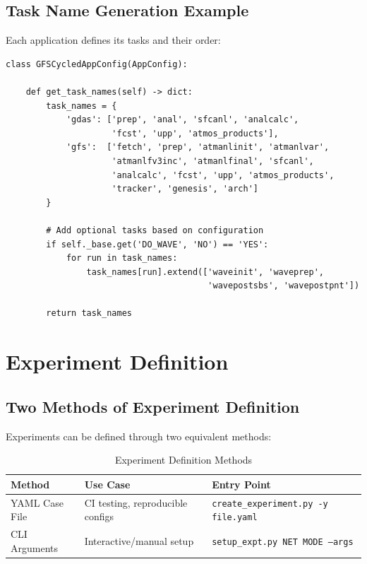 \documentclass[11pt,letterpaper]{article}
\begin{document}
\subsection{Task Name Generation Example}

Each application defines its tasks and their order:

\begin{lstlisting}[style=pythonstyle, title=gfs\_cycled.py (Excerpt)]
class GFSCycledAppConfig(AppConfig):
    
    def get_task_names(self) -> dict:
        task_names = {
            'gdas': ['prep', 'anal', 'sfcanl', 'analcalc', 
                     'fcst', 'upp', 'atmos_products'],
            'gfs':  ['fetch', 'prep', 'atmanlinit', 'atmanlvar',
                     'atmanlfv3inc', 'atmanlfinal', 'sfcanl',
                     'analcalc', 'fcst', 'upp', 'atmos_products',
                     'tracker', 'genesis', 'arch']
        }
        
        # Add optional tasks based on configuration
        if self._base.get('DO_WAVE', 'NO') == 'YES':
            for run in task_names:
                task_names[run].extend(['waveinit', 'waveprep',
                                        'wavepostsbs', 'wavepostpnt'])
        
        return task_names
\end{lstlisting}


\section{Experiment Definition}

\subsection{Two Methods of Experiment Definition}

Experiments can be defined through two equivalent methods:

\begin{table}[H]
\centering
\caption{Experiment Definition Methods}
\label{tab:definition-methods}
\begin{tabular}{@{}lll@{}}
\toprule
\textbf{Method} & \textbf{Use Case} & \textbf{Entry Point} \\
\midrule
YAML Case File & CI testing, reproducible configs & \texttt{create\_experiment.py -y file.yaml} \\
CLI Arguments & Interactive/manual setup & \texttt{setup\_expt.py NET MODE --args} \\
\bottomrule
\end{tabular}
\end{table}
\end{document}
